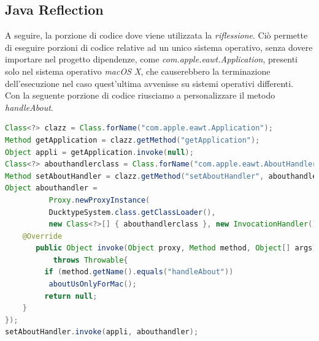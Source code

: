 \subsection{Java Reflection}
\label{sec:javaReflection}
A seguire, la porzione di codice dove viene utilizzata la \emph{riflessione}. Ciò permette di eseguire
porzioni di codice relative ad un unico sistema operativo, senza dovere importare nel progetto
dipendenze, come \emph{com.apple.eawt.Application}, presenti solo nel sistema operativo \emph{macOS X}, che
causerebbero la terminazione dell'esecuzione nel caso quest'ultima avvenisse su sistemi operativi differenti.\\

Con la seguente porzione di codice riusciamo a personalizzare il metodo \emph{handleAbout}.
\begin{lstlisting}[language=java]
Class<?> clazz = Class.forName("com.apple.eawt.Application");
Method getApplication = clazz.getMethod("getApplication");
Object appli = getApplication.invoke(null);
Class<?> abouthandlerclass = Class.forName("com.apple.eawt.AboutHandler");
Method setAboutHandler = clazz.getMethod("setAboutHandler", abouthandlerclass);
Object abouthandler = 
          Proxy.newProxyInstance(
          DucktypeSystem.class.getClassLoader(),
          new Class<?>[] { abouthandlerclass }, new InvocationHandler(){
    @Override
       public Object invoke(Object proxy, Method method, Object[] args)
           throws Throwable{
         if (method.getName().equals("handleAbout"))
          aboutUsOnlyForMac();
         return null;
    }
});
setAboutHandler.invoke(appli, abouthandler);
\end{lstlisting}


